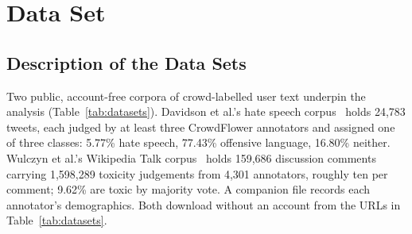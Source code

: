 \section{Data Set}
\label{sec:Data Set}

\subsection{Description of the Data Sets}
\label{subsec:Description of the Data Sets}

Two public, account-free corpora of crowd-labelled user text underpin the analysis
(Table~\ref{tab:datasets}). Davidson et al.'s hate speech corpus~\cite{davidson2017automated}
holds 24,783 tweets, each judged by at least three CrowdFlower annotators and assigned one
of three classes: 5.77\% hate speech, 77.43\% offensive language, 16.80\% neither.
Wulczyn et al.'s Wikipedia Talk corpus~\cite{wulczyn2017ex} holds 159,686 discussion
comments carrying 1,598,289 toxicity judgements from 4,301 annotators, roughly ten per
comment; 9.62\% are toxic by majority vote. A companion file records each annotator's
demographics. Both download without an account from the URLs in Table~\ref{tab:datasets}.


